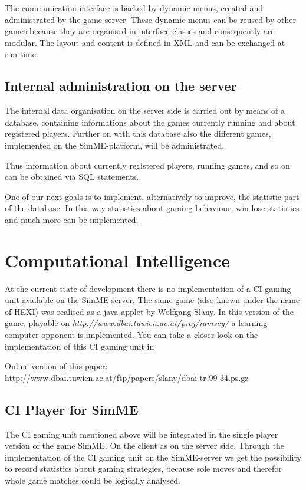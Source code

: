 		The communication interface is backed by dynamic menus, created and
		administrated by the game server. These dynamic menus can be reused by
		other games because they are organised in interface-classes and
		consequently are modular. The layout and content is defined in XML and
		can be exchanged at run-time.

	\subsection{Internal administration on the server}
	
		The internal data organisation on the server side is carried out by
		means of a database, containing informations about the games currently
		running and about registered players. Further on with this database also
		the different games, implemented on the SimME-platform, will be
		administrated.
		
		Thus information about currently registered players, running games, and
		so on can be obtained via SQL statements.
		
		One of our next goals is to implement, alternatively to improve, the
		statistic part of the database. In this way statistics about gaming
		behaviour, win-lose statistics and much more can be implemented.


\section{Computational Intelligence} \label{sec:ci}

	At the current state of development there is no implementation of a CI
	gaming unit available on the SimME-server. The same game (also known under
	the name of HEXI) was realised as a java applet by Wolfgang Slany. In this
	version of the game, playable on
	\textit{http://www.dbai.tuwien.ac.at/proj/ramsey/} a learning computer
	opponent is implemented. You can take a closer look on the implementation of
	this CI gaming unit in \cite{slany_paper}
	
	\noindent Online version of this paper:\\
	http://www.dbai.tuwien.ac.at/ftp/papers/slany/dbai-tr-99-34.ps.gz

	\subsection{CI Player for SimME}
	
		The CI gaming unit mentioned above will be integrated in the single
		player version of the game SimME. On the client as on the server side.
		Through the implementation of the CI gaming unit on the SimME-server we
		get the possibility to record statistics about gaming strategies,
		because sole moves and therefor whole game matches could be logically
		analysed.
		
